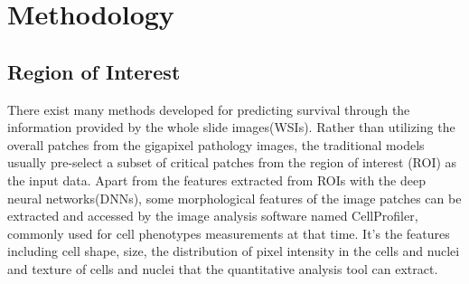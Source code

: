 \documentclass[journal,twoside,web]{ieeecolor}
\begin{document}
\section{Methodology}
\subsection{Region of Interest}
There exist many methods developed for predicting survival through the information provided by the whole slide images(WSIs).
Rather than utilizing the overall patches from the gigapixel pathology images, the traditional models usually pre-select a subset of critical patches from the region of interest (ROI) as the input data.
Apart from the features extracted from ROIs with the deep neural networks(DNNs), some morphological features of the image patches can be extracted and accessed by the image analysis software named CellProfiler\cite{lamprecht2007cellprofiler}, commonly used for cell phenotypes measurements at that time.
It's the features including cell shape, size, the distribution of pixel intensity in the cells and nuclei and texture of cells and nuclei that the quantitative analysis tool can extract.
\end{document}

